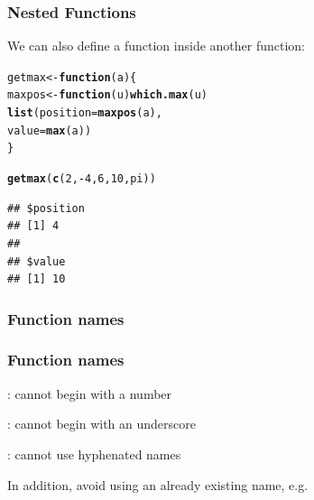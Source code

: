 \documentclass[12pt]{beamer}\usepackage[]{graphicx}\usepackage[]{color}
\makeatletter
\newcommand{\hlnum}[1]{\textcolor[rgb]{0.686,0.059,0.569}{#1}}%
\newcommand{\hlopt}[1]{\textcolor[rgb]{0,0,0}{#1}}%
\newcommand{\hlstd}[1]{\textcolor[rgb]{0.345,0.345,0.345}{#1}}%
\newcommand{\hlkwa}[1]{\textcolor[rgb]{0.161,0.373,0.58}{\textbf{#1}}}%
\newcommand{\hlkwb}[1]{\textcolor[rgb]{0.69,0.353,0.396}{#1}}%
\newcommand{\hlkwc}[1]{\textcolor[rgb]{0.333,0.667,0.333}{#1}}%
\newcommand{\hlkwd}[1]{\textcolor[rgb]{0.737,0.353,0.396}{\textbf{#1}}}%
\newenvironment{kframe}{%
 \def\at@end@of@kframe{}%
 \ifinner\ifhmode%
  \def\at@end@of@kframe{\end{minipage}}%
  \begin{minipage}{\columnwidth}%
 \fi\fi%
 \def\FrameCommand##1{\hskip\@totalleftmargin \hskip-\fboxsep
 \colorbox{shadecolor}{##1}\hskip-\fboxsep
     \hskip-\linewidth \hskip-\@totalleftmargin \hskip\columnwidth}%
 \MakeFramed {\advance\hsize-\width
   \@totalleftmargin\z@ \linewidth\hsize
   \@setminipage}}%
 {\par\unskip\endMakeFramed%
 \at@end@of@kframe}
\newenvironment{knitrout}{}{} %
\makeatother
\begin{document}

\begin{frame}[fragile]
\frametitle{Nested Functions}

We can also define a function inside another function:
\begin{knitrout}\footnotesize
{}\color{fgcolor}\begin{kframe}
\begin{alltt}
\hlstd{getmax} \hlkwb{<-} \hlkwa{function}\hlstd{(}\hlkwc{a}\hlstd{) \{}
  \hlstd{maxpos} \hlkwb{<-} \hlkwa{function}\hlstd{(}\hlkwc{u}\hlstd{)} \hlkwd{which.max}\hlstd{(u)}
  \hlkwd{list}\hlstd{(}\hlkwc{position} \hlstd{=} \hlkwd{maxpos}\hlstd{(a),}
       \hlkwc{value} \hlstd{=} \hlkwd{max}\hlstd{(a))}
\hlstd{\}}

\hlkwd{getmax}\hlstd{(}\hlkwd{c}\hlstd{(}\hlnum{2}\hlstd{,} \hlopt{-}\hlnum{4}\hlstd{,} \hlnum{6}\hlstd{,} \hlnum{10}\hlstd{, pi))}
\end{alltt}
\begin{verbatim}
## $position
## [1] 4
## 
## $value
## [1] 10
\end{verbatim}
\end{kframe}
\end{knitrout}

\end{frame}


\begin{frame}[fragile]
\frametitle{Function names}

\bi
  \item {}
  \item {}
  \item {}
  \item {}
  \item {}
\ei
\eb

\end{frame}


\begin{frame}[fragile]
\frametitle{Function names}

\bi
  \item {}: cannot begin with a number
  \item {}: cannot begin with an underscore
  \item {}: cannot use hyphenated names
\ei
\eb

\bigskip
In addition, avoid using an already existing name, e.g. 

\end{frame}
\end{document}
